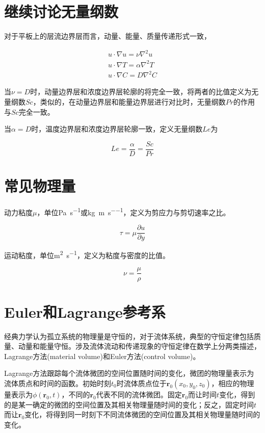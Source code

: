 \section{继续讨论无量纲数}

对于平板上的层流边界层而言，动量、能量、质量传递形式一致，

\begin{gather}
u\cdot \nabla u = \nu \nabla^2 u \\
u\cdot \nabla T = \alpha \nabla^2 T \\
u\cdot \nabla C = D \nabla^2 C
\end{gather}

当$ \nu = D $时，动量边界层和浓度边界层轮廓的将完全一致，将两者的比值定义为无量纲数$ Sc $，类似的，在动量边界层和能量边界层进行对比时，无量纲数$ Pr $的作用与$ Sc $完全一致。

当$ \alpha = D $时，温度边界层和浓度边界层轮廓一致，定义无量纲数$ Le $为

\[ Le = \frac{\alpha}{D} = \frac{Sc}{Pr} \]

\section{常见物理量}

动力粘度$ \mu $，单位\si{\pascal\per\second}或\si{\kilogram\per\meter\per\second}，定义为剪应力与剪切速率之比。

\[\tau = \mu\frac{\partial u}{\partial y}\]

运动粘度，单位\si{\meter\squared\per\second}，定义为粘度与密度的比值。

\[\nu=\frac{\mu}{\rho} \] 

\section{Euler和Lagrange参考系}

经典力学认为孤立系统的物理量是守恒的，对于流体系统，典型的守恒定律包括质量、动量和能量守恒。涉及流体流动和传递现象的守恒定律在数学上分两类描述，Lagrange方法(material volume)和Euler方法(control volume)。

Lagrange方法跟踪每个流体微团的空间位置随时间的变化，微团的物理量表示为流体质点和时间的函数。初始时刻$ t_0 $时流体质点位于$ \bm{r}_0(x_0, y_0, z_0) $，相应的物理量表示为$ \phi(\bm{r}_0, t) $，不同的$ \bm{r}_0 $代表不同的流体微团。固定$ \bm{r}_0 $而让时间$ t $变化，得到的是某一确定的微团的空间位置及其相关物理量随时间的变化；反之，固定时间$ 
t $而让$ \bm{r}_0 $变化，将得到同一时刻下不同流体微团的空间位置及其相关物理量随时间的变化。

